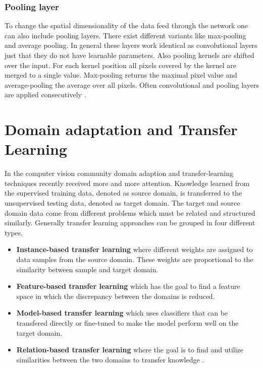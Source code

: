 \subsubsection{Pooling layer}
To change the spatial dimensionality of the data feed through the network one can also include pooling layers. There exist different variants like max-pooling and average pooling. In general these layers work identical as convolutional layers just that they do not have learnable parameters. Also pooling kernels are shifted over the input. For each kernel position all pixels covered by the kernel are merged to a single value. Max-pooling returns the maximal pixel value and average-pooling the average over all pixels. Often convolutional and pooling layers are applied consecutively \cite{OShea2015}.


\section{Domain adaptation and Transfer Learning}

In the computer vision community domain adaption and transfer-learning techniques recently received more and more attention. Knowledge learned from the supervised training data, denoted as source domain, is transferred to the unsupervised testing data, denoted as target domain. The target and source domain data come from different problems which must be related and structured similarly. Generally transfer learning approaches can be grouped in four different types. 

\begin{itemize}
\item \textbf{Instance-based transfer learning} where different weights are assigned to data samples from the source domain. These weights are proportional to the similarity between sample and target domain.
\item \textbf{Feature-based transfer learning} which has the goal to find a feature space in which the discrepancy between the domains is reduced.
\item \textbf{Model-based transfer learning} which uses classifiers that can be transfered directly or fine-tuned to make the model perform well on the target domain.
\item \textbf{Relation-based transfer learning} where the goal is to find and utilize similarities between the two domains to transfer knowledge \cite{AZAMFAR2020103932}. 
\end{itemize}

